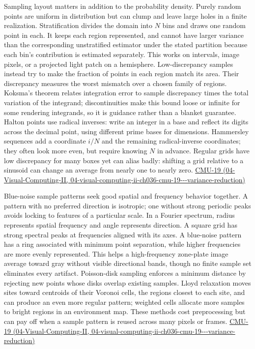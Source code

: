 Sampling layout matters in addition to the probability density. Purely random points are uniform in distribution but can clump and leave large holes in a finite realization. Stratification divides the domain into \(N\) bins and draws one random point in each. It keeps each region represented, and cannot have larger variance than the corresponding unstratified estimator under the stated partition because each bin's contribution is estimated separately. This works on intervals, image pixels, or a projected light patch on a hemisphere. Low-discrepancy samples instead try to make the fraction of points in each region match its area. Their discrepancy measures the worst mismatch over a chosen family of regions. Koksma's theorem relates integration error to sample discrepancy times the total variation of the integrand; discontinuities make this bound loose or infinite for some rendering integrands, so it is guidance rather than a blanket guarantee. Halton points use radical inverses: write an integer in a base and reflect its digits across the decimal point, using different prime bases for dimensions. Hammersley sequences add a coordinate \(i/N\) and the remaining radical-inverse coordinates; they often look more even, but require knowing \(N\) in advance. Regular grids have low discrepancy for many boxes yet can alias badly: shifting a grid relative to a sinusoid can change an average from nearly one to nearly zero. \href{../04-Visual-Computing-II/main.pdf\#nameddest=04-visual-computing-ii-ch036-cmu-19---variance-reduction}{CMU-19 (04-Visual-Computing-II, 04-visual-computing-ii-ch036-cmu-19-\/-\/-variance-reduction)}

Blue-noise sample patterns seek good spatial and frequency behavior together. A pattern with no preferred direction is isotropic; one without strong periodic peaks avoids locking to features of a particular scale. In a Fourier spectrum, radius represents spatial frequency and angle represents direction. A square grid has strong spectral peaks at frequencies aligned with its axes. A blue-noise pattern has a ring associated with minimum point separation, while higher frequencies are more evenly represented. This helps a high-frequency zone-plate image average toward gray without visible directional bands, though no finite sample set eliminates every artifact. Poisson-disk sampling enforces a minimum distance by rejecting new points whose disks overlap existing samples. Lloyd relaxation moves sites toward centroids of their Voronoi cells, the regions closest to each site, and can produce an even more regular pattern; weighted cells allocate more samples to bright regions in an environment map. These methods cost preprocessing but can pay off when a sample pattern is reused across many pixels or frames. \href{../04-Visual-Computing-II/main.pdf\#nameddest=04-visual-computing-ii-ch036-cmu-19---variance-reduction}{CMU-19 (04-Visual-Computing-II, 04-visual-computing-ii-ch036-cmu-19-\/-\/-variance-reduction)}

